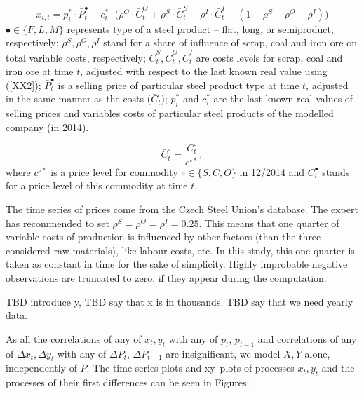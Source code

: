 \documentclass[3p,times]{elsarticle}
\begin{document}
\begin{equation}
x_{i,t}=p_i^* \cdot \bar{P}_t^{\bullet} - c_i^* \cdot \bigl(\rho^{O}\cdot\bar{C}_t^{O}+\rho^{S}\cdot\bar{C}_t^{S}+\rho^{I}\cdot\bar{C}_t^{I}+(1-\rho^{S}-\rho^{O}-\rho^{I})\bigr)
\label{XX}
\end{equation}
$\bullet\in\{F,L,M\}$ represents type of a steel product -- flat, long, or semiproduct, respectively; $\rho^S,\rho^O,\rho^I$ stand for a share of influence of scrap, coal and iron ore on total variable costs, respectively; $\bar{C}_t^{S},\bar{C}_t^{O},\bar{C}_t^{I}$ are costs levels for scrap, coal and iron ore at time $t$, adjusted with respect to the last known real value using (\ref{XX2}); $\bar{P}_t^{\bullet}$ is a selling price of particular steel product type at time $t$, adjusted in the same manner as the costs ($\bar{C}_t$); $p_i^*$ and $c_i^*$ are the last known real values of selling prices and variables costs of particular steel products of the modelled company (in 2014). 

\begin{equation}
\bar{C}_t^{\circ}=\frac{C_t^{\circ}}{c^{\circ *}},
\label{XX2}
\end{equation}
where $c^{\circ *}$ is a price level for commodity $\circ\in\{S,C,O\}$ in 12/2014 and $C_t^{\bullet}$ stands for a price level of this commodity at time $t$.

The time series of prices come from the Czech Steel Union's database. The expert has recommended to set $\rho^S=\rho^O=\rho^I=0.25$. This means that one quarter of variable costs of production is influenced by other factors (than the three considered raw materials), like labour costs, etc. In this study, this one quarter is taken as constant in time for the sake of simplicity.  
Highly improbable negative observations are truncated to zero, if they appear during the computation. 


TBD introduce y, TBD say that x is in thousands. TBD say that we need yearly data.

As all the correlations of any of $x_t,y_t$ with any of $p_t$, $p_{t-1}$  and correlations of any of $\Delta x_t,\Delta y_t$ with any of $\Delta P_t$, $\Delta P_{t-1}$ are insignificant, we model $X,Y$ alone, independently of $P$. The time series plots and xy--plots of processes $x_t,y_t$ and the processes of their first differences can be seen in Figures:



\end{document}
